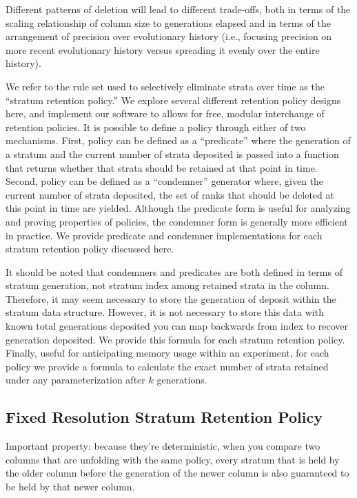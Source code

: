 Different patterns of deletion will lead to different trade-offs, both in terms of the scaling relationship of column size to generations elapsed and in terms of the arrangement of precision over evolutionary history (i.e., focusing precision on more recent evolutionary history versus spreading it evenly over the entire history).

We refer to the rule set used to selectively eliminate strata over time as the ``stratum retention policy.''
We explore several different retention policy designs here, and implement our software to allows for free, modular interchange of retention policies.
It is possible to define a policy through either of two mechanisms.
First, policy can be defined as a ``predicate'' where the generation of a stratum and the current number of strata deposited is passed into a function that returns whether that strata should be retained at that point in time.
Second, policy can be defined as a ``condemner'' generator where, given the current number of strata deposited, the set of ranks that should be deleted at this point in time are yielded.
Although the predicate form is useful for analyzing and proving properties of policies, the condemner form is generally more efficient in practice.
We provide predicate and condemner implementations for each stratum retention policy discussed here.

It should be noted that condemners and predicates are both defined in terms of stratum generation, not stratum index among retained strata in the column.
Therefore, it may seem necessary to store the generation of deposit within the stratum data structure.
However, it is not necessary to store this data with known total generations deposited you can map backwards from index to recover generation deposited.
We provide this formula for each stratum retention policy.
Finally, useful for anticipating memory usage within an experiment, for each policy we provide a formula to calculate the exact number of strata retained under any parameterization after $k$ generations.

\subsection{Fixed Resolution Stratum Retention Policy}
Important property: because they're deterministic, when you compare two columns that are unfolding with the same policy, every stratum that is held by the older column before the generation of the newer column is also guaranteed to be held by that newer column.


